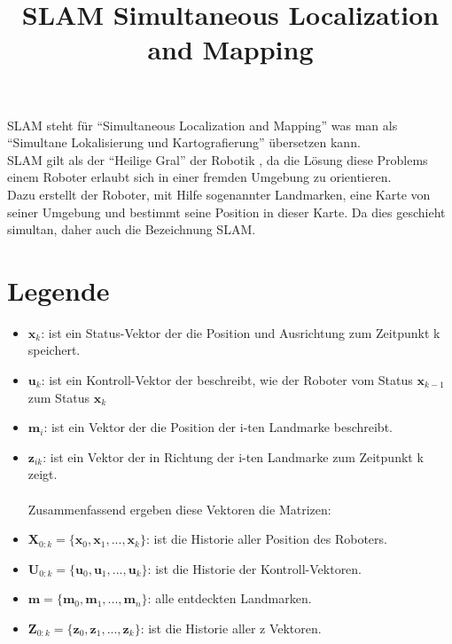 \documentclass[oribibl]{styles/llncs}
\title{SLAM Simultaneous Localization and Mapping}
\author{}
\institute{FH Aachen University of Applied Sciences}
\begin{document}
\maketitle

SLAM steht für "`Simultaneous Localization and Mapping"' was man als "`Simultane Lokalisierung und Kartografierung"' übersetzen kann. \\
SLAM gilt als der "`Heilige Gral"' der Robotik \cite{1638022}, da die Lösung diese Problems einem Roboter erlaubt sich in einer fremden Umgebung zu orientieren. \\
Dazu erstellt der Roboter, mit Hilfe sogenannter Landmarken, eine Karte von seiner Umgebung und bestimmt seine Position in dieser Karte.
Da dies geschieht simultan, daher auch die Bezeichnung SLAM.


\section{Legende}
\begin{itemize}
	\item $\mathbf{x}_k$: ist ein Status-Vektor der die Position und Ausrichtung zum Zeitpunkt k speichert.
	\item $\mathbf{u}_k$: ist ein Kontroll-Vektor der beschreibt, wie der Roboter vom Status $\mathbf{x}_{k-1}$ zum Status $\mathbf{x}_k$
	\item $\mathbf{m}_i$: ist ein Vektor der die Position der i-ten Landmarke beschreibt.
	\item $\mathbf{z}_{ik}$: ist ein Vektor der in Richtung der i-ten Landmarke zum Zeitpunkt k zeigt.	\\ \\
Zusammenfassend ergeben diese Vektoren die Matrizen:
	\item $\mathbf{X}_{0:k} = \{\mathbf{x}_0, \mathbf{x}_1, ..., \mathbf{x}_k\}$: ist die Historie aller Position des Roboters.
	\item $\mathbf{U}_{0:k} = \{\mathbf{u}_0, \mathbf{u}_1, ..., \mathbf{u}_k\}$: ist die Historie der Kontroll-Vektoren.
	\item $\mathbf{m} = \{\mathbf{m}_0, \mathbf{m}_1, ..., \mathbf{m}_n\}$: alle entdeckten Landmarken.
	\item $\mathbf{Z}_{0:k} = \{\mathbf{z}_0, \mathbf{z}_1, ..., \mathbf{z}_k\}$: ist die Historie aller z Vektoren.
\end{itemize}
\cite{1638022}





\end{document}
